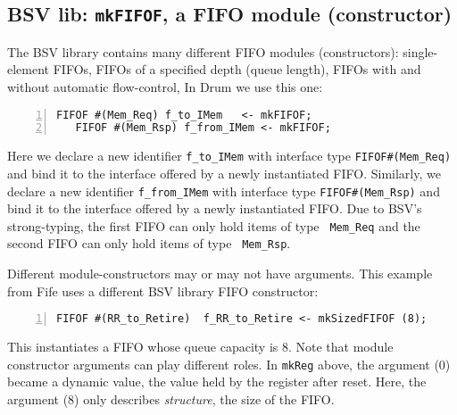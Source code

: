 \subsection{BSV lib: {\tt mkFIFOF}, a FIFO module (constructor)}



The BSV library contains many different FIFO modules (constructors):
single-element FIFOs, FIFOs of a specified depth (queue length), FIFOs
with and without automatic flow-control, {\etc} In Drum we use
this one:


{\small
\begin{Verbatim}[frame=single, numbers=left]
   FIFOF #(Mem_Req) f_to_IMem   <- mkFIFOF;
   FIFOF #(Mem_Rsp) f_from_IMem <- mkFIFOF;
\end{Verbatim}
}

Here we declare a new identifier \verb|f_to_IMem| with interface type
\verb|FIFOF#(Mem_Req)| and bind it to the interface offered by a newly
instantiated FIFO.  Similarly, we declare a new identifier
\verb|f_from_IMem| with interface type \verb|FIFOF#(Mem_Rsp)| and bind
it to the interface offered by a newly instantiated FIFO.  Due to
BSV's strong-typing, the first FIFO can only hold items of type {\tt
Mem\_Req} and the second FIFO can only hold items of type {\tt
Mem\_Rsp}.

Different module-constructors may or may not have arguments.  This
example from Fife uses a different BSV library FIFO constructor:


\begin{Verbatim}[frame=single, numbers=left]
   FIFOF #(RR_to_Retire)  f_RR_to_Retire <- mkSizedFIFOF (8);
\end{Verbatim}

This instantiates a FIFO whose queue capacity is 8.  Note that module
constructor arguments can play different roles.  In \verb|mkReg|
above, the argument (0) became a dynamic value, the value held by the
register after reset.  Here, the argument (8) only describes
\emph{structure}, {\ie} the size of the FIFO.

